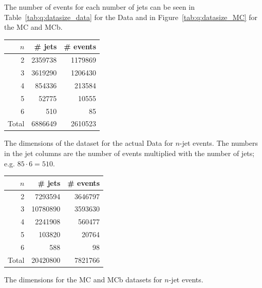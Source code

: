 The number of events for each number of jets can be seen in Table~\ref{tab:q:datasize_data} for the Data and in Figure~\ref{tab:q:datasize_MC} for the MC and MCb. 

\begin{margintable}[1cm]
  \centering
  \begin{tabular}{@{}rrr@{}}
  $n$ &      \# jets &    \# events \\
  \midrule
  \num{2}     &  \num{2359738} &  \num{1179869} \\
  \num{3}     &  \num{3619290} &  \num{1206430} \\
  \num{4}     &   \num{854336} &   \num{213584} \\
  \num{5}     &    \num{52775} &    \num{10555} \\
  \num{6}     &      \num{510} &       \num{85} \\
  Total       &  \num{6886649} &  \num{2610523} \\  
  \end{tabular}
  \vspace{\abovecaptionskip}
  \caption[Dimensions of the Dataset for Data]{The dimensions of the dataset for the actual Data for $n$-jet events. The numbers in the jet columns are the number of events multiplied with the number of jets; e.g. $85 \cdot 6 = 510$.}
  \label{tab:q:datasize_data}
  \vspace{\abovecaptionskip}
\end{margintable}

\begin{margintable}
  \centering
  \begin{tabular}{@{}rrr@{}}
  $n$ &      \# jets &    \# events \\
  \midrule
  \num{2}     &  \num{7293594} &  \num{3646797} \\
  \num{3}     &  \num{10780890} &  \num{3593630} \\
  \num{4}     &   \num{2241908} &   \num{560477} \\
  \num{5}     &    \num{103820} &    \num{20764} \\
  \num{6}     &      \num{588} &       \num{98} \\
  Total       &  \num{20420800} &  \num{7821766} \\  
  \end{tabular}
  \vspace{\abovecaptionskip}
  \caption[Dimensions of the Dataset for MC and MCb]{The dimensions for the MC and MCb datasets for $n$-jet events.}
  \label{tab:q:datasize_MC}
\end{margintable}

